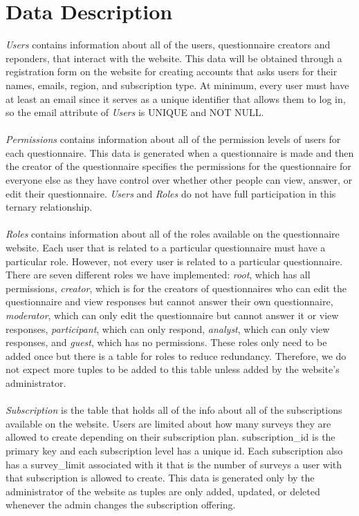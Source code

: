 \documentclass[12pt, oneside, a4paper]{article}
\begin{document}
    \section{Data Description}
    \emph{Users} contains information about all of the users, questionnaire creators and reponders, that interact with the website. This data will be obtained through a registration form on the website for creating accounts that asks users for their names, emails, region, and subscription type. At minimum, every user must have at least an email since it serves as a unique identifier that allows them to log in, so the email attribute of \emph{Users} is UNIQUE and NOT NULL.
    \\
    \\
    \emph{Permissions} contains information about all of the permission levels of users for each questionnaire. This data is generated when a questionnaire is made and then the creator of the questionnaire specifies the permissions for the questionnaire for everyone else as they have control over whether other people can view, answer, or edit their questionnaire. \emph{Users} and \emph{Roles} do not have full participation in this ternary relationship.
    \\
    \\
    \emph{Roles} contains information about all of the roles available on the questionnaire website. Each user that is related to a particular questionnaire must have a particular role. However, not every user is related to a particular questionnaire. There are seven different roles we have implemented: \emph{root}, which has all permissions, \emph{creator}, which is for the creators of questionnaires who can edit the questionnaire and view responses but cannot answer their own questionnaire, \emph{moderator}, which can only edit the questionnaire but cannot answer it or view responses, \emph{participant}, which can only respond, \emph{analyst}, which can only view responses, and \emph{guest}, which has no permissions. These roles only need to be added once but there is a table for roles to reduce redundancy. Therefore, we do not expect more tuples to be added to this table unless added by the website's administrator.
    \\
    \\
    \emph{Subscription} is the table that holds all of the info about all of the subscriptions available on the website. Users are limited about how many surveys they are allowed to create depending on their subscription plan. subscription\_id is the primary key and each subscription level has a unique id. Each subscription also has a survey\_limit associated with it that is the number of surveys a user with that subscription is allowed to create. This data is generated only by the administrator of the website as tuples are only added, updated, or deleted whenever the admin changes the subscription offering.
\end{document}
